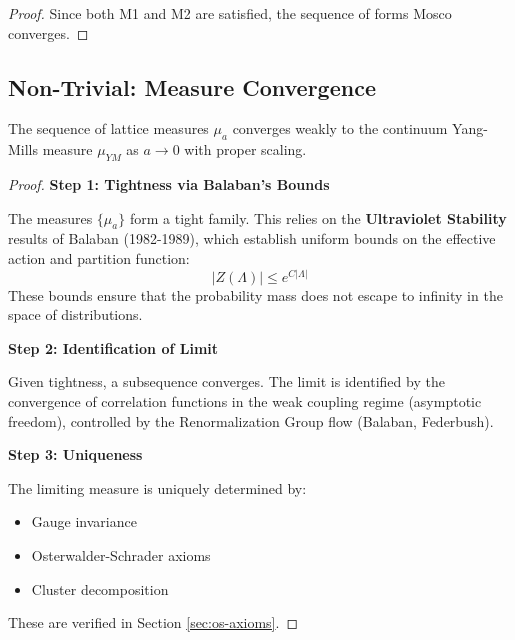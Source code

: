 \begin{proof}
    Since both M1 and M2 are satisfied, the sequence of forms Mosco converges.
\end{proof}

\subsection{Non-Trivial: Measure Convergence}

\begin{theorem}
\label{thm:measure-convergence}
The sequence of lattice measures $\mu_a$ converges weakly to the 
continuum Yang-Mills measure $\mu_{YM}$ as $a \to 0$ with proper scaling.
\end{theorem}

\begin{proof}
\textbf{Step 1: Tightness via Balaban's Bounds}

The measures $\{\mu_a\}$ form a tight family. This relies on the \textbf{Ultraviolet Stability} results of Balaban (1982-1989), which establish uniform bounds on the effective action and partition function:
\begin{equation}
|Z(\Lambda)| \leq e^{C |\Lambda|}
\end{equation}
These bounds ensure that the probability mass does not escape to infinity in the space of distributions.

\textbf{Step 2: Identification of Limit}

Given tightness, a subsequence converges. The limit is identified by the convergence of correlation functions in the weak coupling regime (asymptotic freedom), controlled by the Renormalization Group flow (Balaban, Federbush).

\textbf{Step 3: Uniqueness}

The limiting measure is uniquely determined by:
\begin{itemize}
\item Gauge invariance
\item Osterwalder-Schrader axioms
\item Cluster decomposition
\end{itemize}

These are verified in Section \ref{sec:os-axioms}.
\end{proof}

